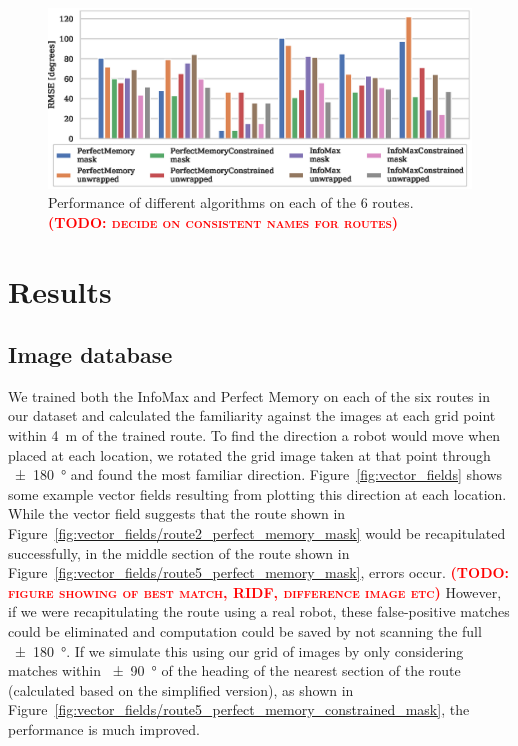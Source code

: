 \documentclass[letterpaper]{article}
\newcommand{\todo}[1]{\textbf{\textsc{\textcolor{red}{(TODO: #1)}}}}
\begin{document}
\begin{figure}[t]
    \centering
    \includegraphics{figures/route_benchmark.eps}
    \caption{Performance of different algorithms on each of the 6 routes. \todo{decide on consistent names for routes}}
    \label{fig:route_benchmark}
\end{figure}

\section{Results}
\subsection{Image database}
We trained both the InfoMax and Perfect Memory on each of the six routes in our dataset and calculated the familiarity against the images at each grid point within \SI{4}{\metre} of the trained route. 
To find the direction a robot would move when placed at each location, we rotated the grid image taken at that point through \SI{\pm 180}{\degree} and found the most familiar direction. 
Figure~\ref{fig:vector_fields} shows some example vector fields resulting from plotting this direction at each location. 
While the vector field suggests that the route shown in Figure~\ref{fig:vector_fields/route2_perfect_memory_mask} would be recapitulated successfully, in the middle section of the route shown in Figure~\ref{fig:vector_fields/route5_perfect_memory_mask}, errors occur.
\todo{figure showing of best match, RIDF, difference image etc}
However, if we were recapitulating the route using a real robot, these false-positive matches could be eliminated and computation could be saved by not scanning the full \SI{\pm 180}{\degree}. 
If we simulate this using our grid of images by only considering matches within \SI{\pm 90}{\degree} of the heading of the nearest section of the route (calculated based on the simplified version), as shown in Figure~\ref{fig:vector_fields/route5_perfect_memory_constrained_mask}, the performance is much improved.
\end{document}
